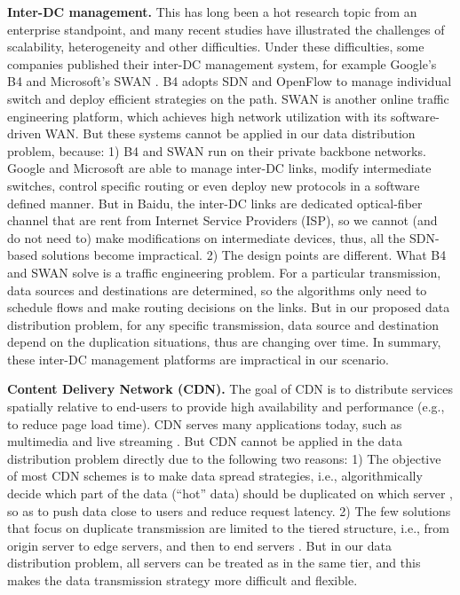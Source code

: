 \textbf{Inter-DC management.} This has long been a hot research topic from an enterprise standpoint, and many recent studies \cite{chen2012design, kavulya2010analysis, mishra2010towards, reiss2012heterogeneity, sharma2011modeling, More, zhang2011characterizing} have illustrated the challenges of scalability, heterogeneity and other difficulties. Under these difficulties, some companies published their inter-DC management system, for example Google's B4 \cite{jain2013b4} and Microsoft's SWAN \cite{hong2013achieving}. B4 adopts SDN \cite{mckeown2009software} and OpenFlow \cite{OpenFlow,mckeown2008openflow} to manage individual switch and deploy efficient strategies on the path. SWAN is another online traffic engineering platform, which achieves high network utilization with its software-driven WAN. But these systems cannot be applied in our data distribution problem, because: 1) B4 and SWAN run on their private backbone networks. Google and Microsoft are able to manage inter-DC links, modify intermediate switches, control specific routing or even deploy new protocols in a software defined manner. But in Baidu, the inter-DC links are dedicated optical-fiber channel that are rent from Internet Service Providers (ISP), so we cannot (and do not need to) make modifications on intermediate devices, thus, all the SDN-based solutions become impractical. 2) The design points are different. What B4 and SWAN solve is a traffic engineering problem. For a particular transmission, data sources and destinations are determined, so the algorithms only need to schedule flows and make routing decisions on the links. But in our proposed data distribution problem, for any specific transmission, data source and destination depend on the duplication situations, thus are changing over time. In summary, these inter-DC management platforms are impractical in our scenario.

\textbf{Content Delivery Network (CDN).} The goal of CDN is to distribute services spatially relative to end-users to provide high availability and performance (e.g., to reduce page load time). CDN serves many applications today, such as multimedia \cite{zhu2011multimedia} and live streaming \cite{sripanidkulchai2004analysis}. But CDN cannot be applied in the data distribution problem directly due to the following two reasons: 1) The objective of most CDN schemes is to make data spread strategies, i.e., algorithmically decide which part of the data (``hot'' data) should be duplicated on which server \cite{zhang2013maygh}, so as to push data close to users and reduce request latency. 2) The few solutions that focus on duplicate transmission are limited to the tiered structure, i.e., from origin server to edge servers, and then to end servers \cite{kostic2003bullet}. But in our data distribution problem, all servers can be treated as in the same tier, and this makes the data transmission strategy more difficult and flexible.


